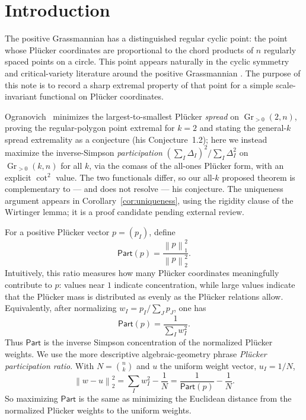\documentclass[11pt]{article}
\newcommand{\Gr}{\operatorname{Gr}}
\newcommand{\Part}{\mathsf{Part}}
\newcommand{\norm}[1]{\left\|#1\right\|}
\begin{document}
\noindent\begin{minipage}{\textwidth}
\tableofcontents
\end{minipage}

\section{Introduction}

The positive Grassmannian has a distinguished regular cyclic point: the point
whose Plücker coordinates are proportional to the chord products of \(n\)
regularly spaced points on a circle.  This point appears naturally in the
cyclic symmetry and critical-variety literature around the positive
Grassmannian \cite{Postnikov2006,Karp2018,GalashinCritical}.  The purpose of
this note is to record a sharp extremal property of that point for a simple
scale-invariant functional on Plücker coordinates.

Ogranovich~\cite{ogranovich2020regular} minimizes the largest-to-smallest
Plücker \emph{spread} on \(\Gr_{>0}(2,n)\), proving the regular-polygon point
extremal for \(k=2\) and stating the general-\(k\) spread extremality as a
conjecture (his Conjecture~1.2); here we instead maximize the inverse-Simpson
\emph{participation} \((\sum_I\Delta_I)^2/\sum_I\Delta_I^2\) on \(\Gr_{>0}(k,n)\)
for all \(k\), via the comass of the all-ones Plücker form, with an explicit
\(\cot^2\) value.  The two functionals differ, so our all-\(k\) proposed theorem is
complementary to --- and does not resolve --- his conjecture. The uniqueness argument appears in
Corollary~\ref{cor:uniqueness}, using the rigidity clause of the Wirtinger
lemma; it is a proof candidate pending external review.

For a positive Plücker vector \(p=(p_I)\), define
\[
  \Part(p)=\frac{\norm{p}_1^2}{\norm{p}_2^2}.
\]
Intuitively, this ratio measures how many Plücker coordinates meaningfully
contribute to \(p\): values near \(1\) indicate concentration, while large
values indicate that the Plücker mass is distributed as evenly as the Plücker
relations allow.
Equivalently, after normalizing \(w_I=p_I/\sum_J p_J\), one has
\[
  \Part(p)=\frac{1}{\sum_I w_I^2}.
\]
Thus \(\Part\) is the inverse Simpson concentration of the normalized Plücker
weights.  We use the more descriptive algebraic-geometry phrase
\emph{Plücker participation ratio}.
With \(N=\binom nk\) and \(u\) the uniform weight vector, \(u_I=1/N\),
\[
  \norm{w-u}_2^2=\sum_I w_I^2-\frac1N=\frac{1}{\Part(p)}-\frac1N .
\]
So maximizing \(\Part\) is the same as minimizing the Euclidean distance from the normalized
Plücker weights to the uniform weights.
\end{document}
